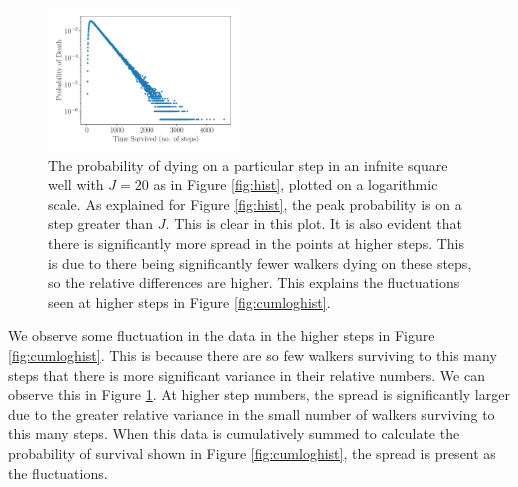 \documentclass[journal]{IEEEtran}
\begin{document}
\begin{figure}%
  \begin{center}
    \includegraphics[width=0.45\textwidth]{images/line_plot.pdf}
    \caption{The probability of dying on a particular step in an infnite square
      well with $J=20$ as in Figure \ref{fig:hist}, plotted on a logarithmic
      scale. As explained for Figure \ref{fig:hist}, the peak probability is on
      a step greater than $J$. This is clear in this plot. It is also evident
      that there is significantly more spread in the points at higher
      steps. This is due to there being significantly fewer walkers dying on
      these steps, so the relative differences are higher. This explains the
      fluctuations seen at higher steps in Figure \ref{fig:cumloghist}.}
    \label{fig:loghist}
  \end{center}
\end{figure}

We observe some fluctuation in the data in the higher steps in Figure
\ref{fig:cumloghist}. This is because there are so few walkers surviving to this
many steps that there is more significant variance in their relative numbers. We
can observe this in Figure \ref{fig:loghist}. At higher step numbers, the spread
is significantly larger due to the greater relative variance in the small number
of walkers surviving to this many steps. When this data is cumulatively summed
to calculate the probability of survival shown in Figure \ref{fig:cumloghist},
the spread is present as the fluctuations.
\end{document}
